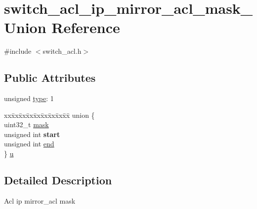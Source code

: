 \hypertarget{unionswitch__acl__ip__mirror__acl__mask__}{\section{switch\+\_\+acl\+\_\+ip\+\_\+mirror\+\_\+acl\+\_\+mask\+\_\+ Union Reference}
\label{unionswitch__acl__ip__mirror__acl__mask__}
}


{\ttfamily \#include $<$switch\+\_\+acl.\+h$>$}

\subsection*{Public Attributes}
\begin{DoxyCompactItemize}
\item 
unsigned \hyperlink{unionswitch__acl__ip__mirror__acl__mask___a068e140e14fd896a0651fce09f886a70}{type}\+: 1
\item 
\begin{tabbing}
xx\=xx\=xx\=xx\=xx\=xx\=xx\=xx\=xx\=\kill
union \{\\
\>uint32\_t \hyperlink{unionswitch__acl__ip__mirror__acl__mask___a2293a3ec5e820485c86c6f3f3db73759}{mask}\\
\>unsigned int {\bfseries start}\\
\>unsigned int \hyperlink{unionswitch__acl__ip__mirror__acl__mask___ab415589dfee1e4431325003792e78421}{end}\\
\} \hyperlink{unionswitch__acl__ip__mirror__acl__mask___a5a05441a70c21ff2f665269d6a640f7a}{u}\\

\end{tabbing}\end{DoxyCompactItemize}


\subsection{Detailed Description}
Acl ip mirror\+\_\+acl mask 

